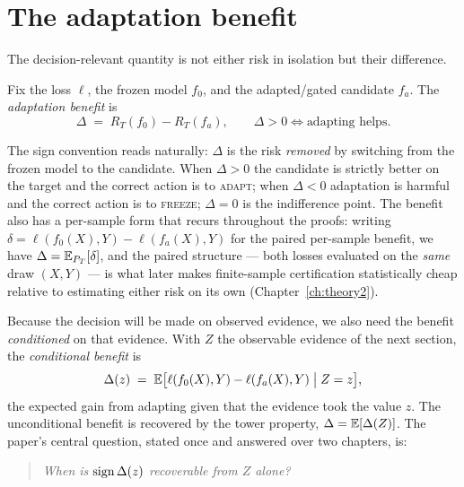 \section{The adaptation benefit}\label{sec:form-benefit}

The decision-relevant quantity is not either risk in isolation but their
difference.

\begin{definition}\label{def:form-benefit}
Fix the loss $\ell$, the frozen model $f_0$, and the adapted/gated candidate
$f_a$. The \emph{adaptation benefit} is
\begin{equation}\label{eq:form-benefit}
\Delta \;=\; R_T(f_0)-R_T(f_a),\qquad \Delta>0 \iff \text{adapting helps.}
\end{equation}
\end{definition}

The sign convention reads naturally: $\Delta$ is the risk \emph{removed} by
switching from the frozen model to the candidate. When $\Delta > 0$ the
candidate is strictly better on the target and the correct action is to
\textsc{adapt}; when $\Delta < 0$ adaptation is harmful and the correct
action is to \textsc{freeze}; $\Delta = 0$ is the indifference point. The
benefit also has a per-sample form that recurs throughout the proofs: writing
$\delta = \ell(f_0(X),Y) - \ell(f_a(X),Y)$ for the paired per-sample benefit,
we have $\Delta = \mathbb{E}_{P_T}[\delta]$, and the paired structure --- both losses
evaluated on the \emph{same} draw $(X,Y)$ --- is what later makes
finite-sample certification statistically cheap relative to estimating either
risk on its own (Chapter~\ref{ch:theory2}).

Because the decision will be made on observed evidence, we also need the
benefit \emph{conditioned} on that evidence. With $Z$ the observable evidence
of the next section, the \emph{conditional benefit} is
\begin{equation}\label{eq:form-condbenefit}
\Delta(z)\;=\;\mathbb{E}\bigl[\ell(f_0(X),Y)-\ell(f_a(X),Y)\;\big|\; Z=z\bigr],
\end{equation}
the expected gain from adapting given that the evidence took the value $z$.
The unconditional benefit is recovered by the tower property, $\Delta =
\mathbb{E}[\Delta(Z)]$. The paper's central question, stated once and answered over
two chapters, is:

\begin{quote}
\emph{When is $\operatorname{sign}\Delta(z)$ recoverable from $Z$ alone?}
\end{quote}

